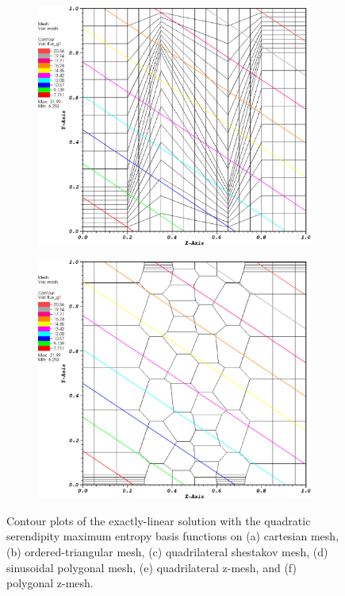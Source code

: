 \begin{figure}
\begin{subfigure}[b]{0.45\textwidth}
		\caption{}
	\end{subfigure}
	\vfill
	\begin{subfigure}[b]{0.45\textwidth}
		\centering
		\label{subfig::z_quad_me_k2_lin_sol}
		\includegraphics[width=\textwidth]{figures/sec_BF/z_quad_MAXENT_k2.eps}
		\caption{}
	\end{subfigure}
	\hfill
	\begin{subfigure}[b]{0.45\textwidth}
		\centering
		\label{subfig::z_poly_me_k2_lin_sol}
		\includegraphics[width=\textwidth]{figures/sec_BF/z_poly_MAXENT_k2.eps}
		\caption{}
	\end{subfigure}
\caption{Contour plots of the exactly-linear solution with the quadratic serendipity maximum entropy basis functions on (a) cartesian mesh, (b) ordered-triangular mesh, (c) quadrilateral shestakov mesh, (d) sinusoidal polygonal mesh, (e) quadrilateral z-mesh, and (f) polygonal z-mesh.}
\label{fig::BF_Results_Linear_me2_sol}
\end{figure}

